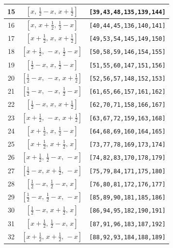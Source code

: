 \documentclass[fleqn,8pt]{jsarticle}
\begin{document}
\begin{longtable}{ccc}
15 & $\left[ x,\, \frac{1}{2} - x,\, x + \frac{1}{2} \right]$ & {\tt [39,43,48,135,139,144]} \\ \hline
16 & $\left[ x,\, x + \frac{1}{2},\, \frac{1}{2} - x \right]$ & {\tt [40,44,45,136,140,141]} \\ \hline
17 & $\left[ x + \frac{1}{2},\, x,\, x + \frac{1}{2} \right]$ & {\tt [49,53,54,145,149,150]} \\ \hline
18 & $\left[ x + \frac{1}{2},\, - x,\, \frac{1}{2} - x \right]$ & {\tt [50,58,59,146,154,155]} \\ \hline
19 & $\left[ \frac{1}{2} - x,\, x,\, \frac{1}{2} - x \right]$ & {\tt [51,55,60,147,151,156]} \\ \hline
20 & $\left[ \frac{1}{2} - x,\, - x,\, x + \frac{1}{2} \right]$ & {\tt [52,56,57,148,152,153]} \\ \hline
21 & $\left[ \frac{1}{2} - x,\, - x,\, \frac{1}{2} - x \right]$ & {\tt [61,65,66,157,161,162]} \\ \hline
22 & $\left[ \frac{1}{2} - x,\, x,\, x + \frac{1}{2} \right]$ & {\tt [62,70,71,158,166,167]} \\ \hline
23 & $\left[ x + \frac{1}{2},\, - x,\, x + \frac{1}{2} \right]$ & {\tt [63,67,72,159,163,168]} \\ \hline
24 & $\left[ x + \frac{1}{2},\, x,\, \frac{1}{2} - x \right]$ & {\tt [64,68,69,160,164,165]} \\ \hline
25 & $\left[ x + \frac{1}{2},\, x + \frac{1}{2},\, x \right]$ & {\tt [73,77,78,169,173,174]} \\ \hline
26 & $\left[ x + \frac{1}{2},\, \frac{1}{2} - x,\, - x \right]$ & {\tt [74,82,83,170,178,179]} \\ \hline
27 & $\left[ \frac{1}{2} - x,\, x + \frac{1}{2},\, - x \right]$ & {\tt [75,79,84,171,175,180]} \\ \hline
28 & $\left[ \frac{1}{2} - x,\, \frac{1}{2} - x,\, x \right]$ & {\tt [76,80,81,172,176,177]} \\ \hline
29 & $\left[ \frac{1}{2} - x,\, \frac{1}{2} - x,\, - x \right]$ & {\tt [85,89,90,181,185,186]} \\ \hline
30 & $\left[ \frac{1}{2} - x,\, x + \frac{1}{2},\, x \right]$ & {\tt [86,94,95,182,190,191]} \\ \hline
31 & $\left[ x + \frac{1}{2},\, \frac{1}{2} - x,\, x \right]$ & {\tt [87,91,96,183,187,192]} \\ \hline
32 & $\left[ x + \frac{1}{2},\, x + \frac{1}{2},\, - x \right]$ & {\tt [88,92,93,184,188,189]} \\
\end{longtable}
\end{document}
